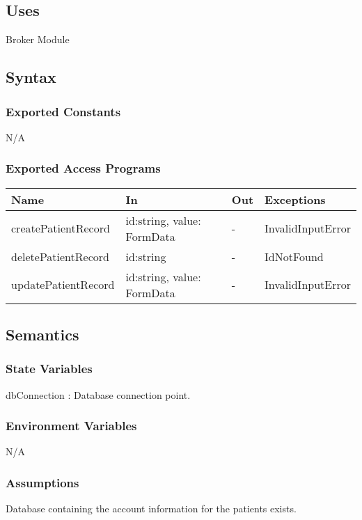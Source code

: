 \documentclass[12pt, titlepage]{article}
\begin{document}
\subsection{Uses}
Broker Module\\

\subsection{Syntax}

\subsubsection{Exported Constants}
N/A

\subsubsection{Exported Access Programs}

\begin{center}
\begin{tabular}{p{4cm} p{4.5cm} p{1cm} p{2.5cm}}
\hline
\textbf{Name} & \textbf{In} & \textbf{Out} & \textbf{Exceptions} \\
\hline
createPatientRecord & id:string, value: FormData & - & InvalidInputError \\
deletePatientRecord & id:string & - & IdNotFound\\
updatePatientRecord & id:string, value: FormData & - & InvalidInputError \\
\hline
\end{tabular}
\end{center}

\subsection{Semantics}

\subsubsection{State Variables}
dbConnection : Database connection point.

\subsubsection{Environment Variables}
N/A

\subsubsection{Assumptions}
Database containing the account information for the patients exists.
\end{document}
